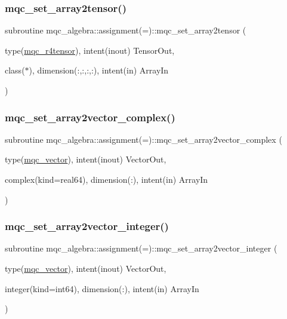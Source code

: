 \subsubsection{\texorpdfstring{mqc\_set\_array2tensor()}{mqc\_set\_array2tensor()}}
{\footnotesize\ttfamily subroutine mqc\+\_\+algebra\+::assignment(=)\+::mqc\+\_\+set\+\_\+array2tensor (\begin{DoxyParamCaption}\item[{type(\mbox{\hyperlink{structmqc__algebra_1_1mqc__r4tensor}{mqc\+\_\+r4tensor}}), intent(inout)}]{Tensor\+Out,  }\item[{class($\ast$), dimension(\+:,\+:,\+:,\+:), intent(in)}]{Array\+In }\end{DoxyParamCaption})}

\mbox{\label{interfacemqc__algebra_1_1assignment_07_0A_08_a7691df8ae425ea315de2d3e41e855cf7}} 
\subsubsection{\texorpdfstring{mqc\_set\_array2vector\_complex()}{mqc\_set\_array2vector\_complex()}}
{\footnotesize\ttfamily subroutine mqc\+\_\+algebra\+::assignment(=)\+::mqc\+\_\+set\+\_\+array2vector\+\_\+complex (\begin{DoxyParamCaption}\item[{type(\mbox{\hyperlink{structmqc__algebra_1_1mqc__vector}{mqc\+\_\+vector}}), intent(inout)}]{Vector\+Out,  }\item[{complex(kind=real64), dimension(\+:), intent(in)}]{Array\+In }\end{DoxyParamCaption})}

\mbox{\label{interfacemqc__algebra_1_1assignment_07_0A_08_abb0fd860cfa6a9d9746dc1839d178a78}} 
\subsubsection{\texorpdfstring{mqc\_set\_array2vector\_integer()}{mqc\_set\_array2vector\_integer()}}
{\footnotesize\ttfamily subroutine mqc\+\_\+algebra\+::assignment(=)\+::mqc\+\_\+set\+\_\+array2vector\+\_\+integer (\begin{DoxyParamCaption}\item[{type(\mbox{\hyperlink{structmqc__algebra_1_1mqc__vector}{mqc\+\_\+vector}}), intent(inout)}]{Vector\+Out,  }\item[{integer(kind=int64), dimension(\+:), intent(in)}]{Array\+In }\end{DoxyParamCaption})}

